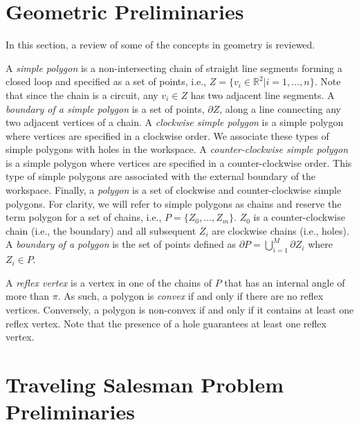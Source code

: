 \documentclass[../main.tex]{subfiles}
\begin{document}


\section{Geometric Preliminaries}
\label{section:background_geometry}

In this section, a review of some of the concepts in geometry is reviewed.

A \emph{simple polygon} is a non-intersecting chain of straight line segments forming a closed loop and specified as a set of points, i.e., $Z=\{v_i\in\mathbb{R}^2|i=1,\ldots,n\}$. Note that since the chain is a circuit, any $v_i\in Z$ has two adjacent line segments. A \emph{boundary of a simple polygon} is a set of points, $\partial Z$, along a line connecting any two adjacent vertices of a chain. A \emph{clockwise simple polygon} is a simple polygon where vertices are specified in a clockwise order. We associate these types of simple polygons with holes in the workspace. A \emph{counter-clockwise simple polygon} is a simple polygon where vertices are specified in a counter-clockwise order. This type of simple polygons are associated with the external boundary of the workspace. Finally, a \emph{polygon} is a set of clockwise and counter-clockwise simple polygons. For clarity, we will refer to simple polygons as chains and reserve the term polygon for a set of chains, i.e., $P=\{Z_0,\ldots,Z_m\}$. $Z_0$ is a counter-clockwise chain (i.e., the boundary) and all subsequent $Z_i$ are clockwise chains (i.e., holes). A \emph{boundary of a polygon} is the set of points defined as $\partial P=\bigcup^M_{i=1}\partial Z_i$ where $Z_i\in P$.

A \emph{reflex vertex} is a vertex in one of the chains of $P$ that has an internal angle of more than $\pi$. As such, a polygon is \emph{convex} if and only if there are no reflex vertices. Conversely, a polygon is non-convex if and only if it contains at least one reflex vertex. Note that the presence of a hole guarantees at least one reflex vertex.

\section{Traveling Salesman Problem Preliminaries}
\label{section:GTSP}
\end{document}
